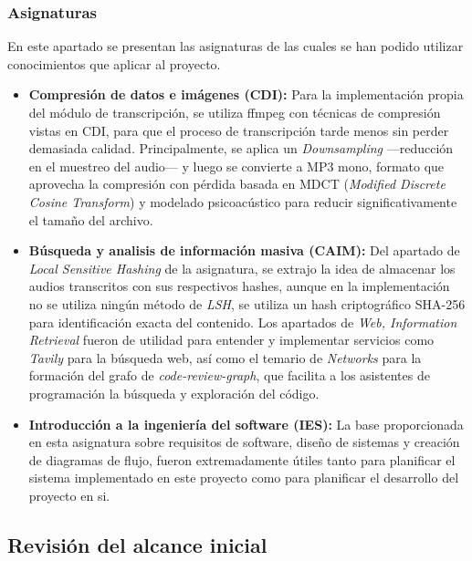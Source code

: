 \documentclass[11pt, letterpaper]{article}
\begin{document}
\subsubsection{Asignaturas}
\label{sec:asignaturas}
En este apartado se presentan las asignaturas de las cuales se han podido utilizar conocimientos que aplicar al proyecto.

\begin{itemize}
    \item \textbf{Compresión de datos e imágenes (CDI):} Para la implementación propia del módulo de transcripción, se utiliza ffmpeg con técnicas de compresión vistas en CDI, para que el proceso de transcripción tarde menos sin perder demasiada calidad. Principalmente, se aplica un \textit{Downsampling} ---reducción en el muestreo del audio--- y luego se convierte a MP3 mono, formato que aprovecha la compresión con pérdida basada en MDCT (\textit{Modified Discrete Cosine Transform}) y modelado psicoacústico para reducir significativamente el tamaño del archivo.
    \item \textbf{Búsqueda y analisis de información masiva (CAIM):} Del apartado de \textit{Local Sensitive Hashing} de la asignatura, se extrajo la idea de almacenar los audios transcritos con sus respectivos hashes, aunque en la implementación no se utiliza ningún método de \textit{LSH}, se utiliza un hash criptográfico SHA-256 para identificación exacta del contenido. Los apartados de \textit{Web, Information Retrieval} fueron de utilidad para entender y implementar servicios como \textit{Tavily} para la búsqueda web, así como el temario de \textit{Networks} para la formación del grafo de \textit{code-review-graph}, que facilita a los asistentes de programación la búsqueda y exploración del código.
    \item \textbf{Introducción a la ingeniería del software (IES):} La base proporcionada en esta asignatura sobre requisitos de software, diseño de sistemas y creación de diagramas de flujo, fueron extremadamente útiles tanto para planificar el sistema implementado en este proyecto como para planificar el desarrollo del proyecto en si.
    
\end{itemize}

\newpage


\subsection{Revisión del alcance inicial}
\label{sec:revision_alcance}
\end{document}
